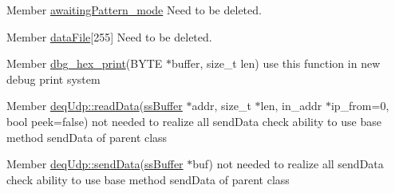 \label{dd/da0/todo__todo000002}
\hypertarget{dd/da0/todo__todo000002}{}
 
\begin{DoxyDescription}
\item[Member \hyperlink{__global_8h_a4782e050d0dcca5c4777eb721715e596}{awaitingPattern\_\-mode} ]Need to be deleted. 
\end{DoxyDescription}

\label{dd/da0/todo__todo000006}
\hypertarget{dd/da0/todo__todo000006}{}
 
\begin{DoxyDescription}
\item[Member \hyperlink{__global_8h_ac8b387c7463c2bfccb68e1152a8c84b9}{dataFile}\mbox{[}255\mbox{]} ]Need to be deleted. 
\end{DoxyDescription}

\label{dd/da0/todo__todo000014}
\hypertarget{dd/da0/todo__todo000014}{}
 
\begin{DoxyDescription}
\item[Member \hyperlink{main_8cpp_aa826989c29ffd5838253ec6f620a9f84}{dbg\_\-hex\_\-print}(BYTE $\ast$buffer, size\_\-t len) ]use this function in new debug print system 
\end{DoxyDescription}

\label{dd/da0/todo__todo000009}
\hypertarget{dd/da0/todo__todo000009}{}
 
\begin{DoxyDescription}
\item[Member \hyperlink{classdeqUdp_afd4705cd64f0f137d1f36860761f4865}{deqUdp::readData}(\hyperlink{classssBuffer}{ssBuffer} $\ast$addr, size\_\-t $\ast$len, in\_\-addr $\ast$ip\_\-from=0, bool peek=false) ]not needed to realize all sendData check ability to use base method sendData of parent class 
\end{DoxyDescription}

\label{dd/da0/todo__todo000008}
\hypertarget{dd/da0/todo__todo000008}{}
 
\begin{DoxyDescription}
\item[Member \hyperlink{classdeqUdp_a1e50010f100ae79d810f8d4889ac361b}{deqUdp::sendData}(\hyperlink{classssBuffer}{ssBuffer} $\ast$buf) ]not needed to realize all sendData check ability to use base method sendData of parent class 
\end{DoxyDescription}

\label{dd/da0/todo__todo000010}
\hypertarget{dd/da0/todo__todo000010}{}
 
